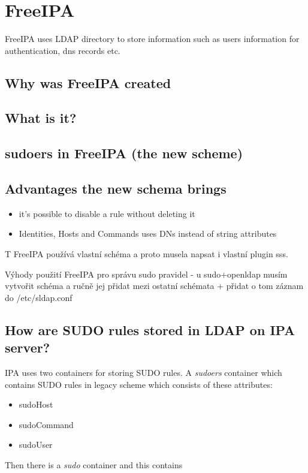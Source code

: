 \documentclass[12pt,a4paper,titlepage,final]{article}
\begin{document}
\section{FreeIPA}
FreeIPA uses LDAP directory to store information such as users information for
authentication, dns records etc.

\subsection{Why was FreeIPA created}

\subsection{What is it?}

\subsection{sudoers in FreeIPA (the new scheme)}

\subsection{Advantages the new schema brings}
\begin{itemize}
	\item it's possible to disable a rule without deleting it
	\item Identities, Hosts and Commands uses DNs instead of string attributes
\end{itemize}
T
FreeIPA používá vlastní schéma a proto musela napsat i vlastní plugin sss.

Výhody použití FreeIPA pro správu sudo pravidel - u sudo+openldap musím vytvořit
schéma a ručně jej přidat mezi ostatní schémata + přidat o tom záznam do
/etc/sldap.conf

\subsection{How are SUDO rules stored in LDAP on IPA server?}
IPA uses two containers for storing SUDO rules. A \emph{sudoers} container
which contains SUDO rules in legacy scheme which consists of these attributes:
\begin{itemize}
	\item sudoHost
	\item sudoCommand
	\item sudoUser
\end{itemize}
Then there is a \emph{sudo} container and this contains 
\end{document}
